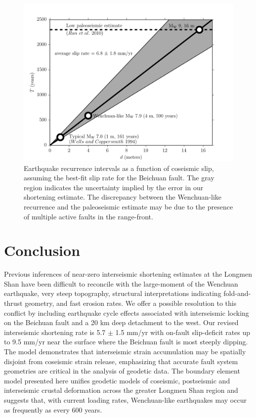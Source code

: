\documentclass[draft,jgrga]{agutex}
\begin{document}
\begin{article}
\begin{figure}[h!]
    \centering
    \includegraphics{figs/hazard_all_details.pdf}
    \caption{Earthquake recurrence intervals as a function of coseismic slip, assuming the best-fit slip rate for the Beichuan fault. The gray region indicates the uncertainty implied by the error in our shortening estimate. The discrepancy between the Wenchuan-like recurrence and the paleoseismic estimate may be due to the presence of multiple active faults in the range-front.}
    \label{fig:hazard}
\end{figure}

\section{Conclusion}
Previous inferences of near-zero interseismic shortening estimates at the Longmen Shan have been difficult to reconcile with the large-moment of the Wenchuan earthquake, very steep topography, structural interpretations indicating fold-and-thrust geometry, and fast erosion rates. We offer a possible resolution to this conflict by including earthquake cycle effects associated with interseismic locking on the Beichuan fault and a 20 km deep detachment to the west. Our revised interseismic shortening rate is 5.7 $\pm$ 1.5 mm/yr with on-fault slip-deficit rates up to 9.5 mm/yr near the surface where the Beichuan fault is most steeply dipping. The model demonstrates that interseismic strain accumulation may be spatially disjoint from coseismic strain release, emphasizing that accurate fault system geometries are critical in the analysis of geodetic data. The boundary element model presented here unifies geodetic models of coseismic, postseismic and interseismic crustal deformation across the greater Longmen Shan region and suggests that, with current loading rates, Wenchuan-like earthquakes may occur as frequently as every 600 years.




\end{article}
\end{document}
